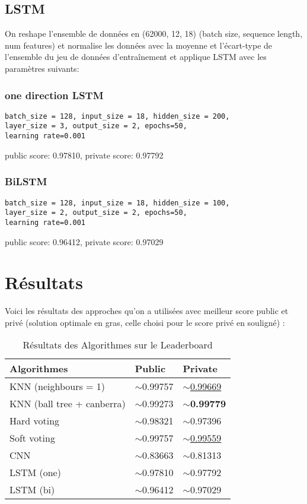 \documentclass{article}
\begin{document}
\subsection{LSTM}
On reshape l'ensemble de données en (62000, 12, 18) (batch size, sequence
 length, num features) et normalise les données avec la moyenne et l'écart-type 
 de l'ensemble du jeu de données d'entraînement et applique LSTM avec les 
 paramètres suivants: 
\subsubsection{one direction LSTM}
\begin{verbatim}
batch_size = 128, input_size = 18, hidden_size = 200,
layer_size = 3, output_size = 2, epochs=50, 
learning rate=0.001   
\end{verbatim}
public score: 0.97810, private score: 0.97792

\subsubsection{BiLSTM}
\begin{verbatim}
batch_size = 128, input_size = 18, hidden_size = 100,
layer_size = 2, output_size = 2, epochs=50, 
learning rate=0.001         
\end{verbatim}
public score: 0.96412, private score: 0.97029

\section{Résultats}
Voici les résultats des approches qu'on a utilisées avec meilleur score public 
et privé (solution optimale en gras, celle choisi pour le score privé en 
souligné) :

\begin{table}[!htbp]
  \caption{Résultats des Algorithmes sur le Leaderboard}
  \label{results-table}
  \centering
  \begin{tabular}{lll}
    \toprule
    Algorithmes     & Public     & Private \\
    \midrule
    KNN (neighbours = 1) & $\sim$0.99757  & \underline{$\sim$0.99669} \\
    KNN (ball tree + canberra) & $\sim$0.99273  & \textbf{$\sim$0.99779} \\
    Hard voting & $\sim$0.98321  & $\sim$0.97396 \\
    Soft voting & $\sim$0.99757  & \underline{$\sim$0.99559} \\
    CNN & $\sim$0.83663  & $\sim$0.81313 \\
    LSTM (one) & $\sim$0.97810  & $\sim$0.97792 \\
    LSTM (bi) & $\sim$0.96412  & $\sim$0.97029 \\
    \bottomrule
  \end{tabular}
\end{table}
\end{document}
